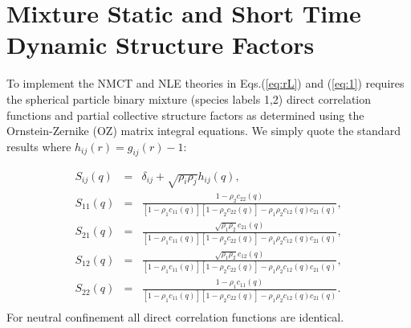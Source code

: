 \documentclass[twocolumn,showpacs,preprintnumbers,amsmath,amssymb,unsortedaddress,
]{revtex4-1}
\begin{document}
\section{Mixture Static and Short Time Dynamic Structure Factors}
To implement the NMCT and NLE theories in Eqs.(\ref{eq:rL}) and (\ref{eq:1}) requires the spherical particle binary mixture (species labels 1,2) direct correlation functions and partial collective structure factors as determined using the Ornstein-Zernike (OZ) matrix integral equations. We simply quote the standard results \cite{34} where $h_{ij}(r) = g_{ij}(r)-1$:

\begin{eqnarray}
S_{ij}(q) & =& \delta_{ij} + \sqrt{\rho_i\rho_j}h_{ij}(q),\nonumber\\
S_{11}(q) &=& \frac{1-\rho_2c_{22}(q)}{[1-\rho_1c_{11}(q)][1-\rho_2c_{22}(q)]-\rho_1\rho_2c_{12}(q)c_{21}(q)},\nonumber\\
S_{21}(q) &=& \frac{\sqrt{\rho_1\rho_2}c_{21}(q)}{[1-\rho_1c_{11}(q)][1-\rho_2c_{22}(q)]-\rho_1\rho_2c_{12}(q)c_{21}(q)},\nonumber\\
S_{12}(q) &=& \frac{\sqrt{\rho_1\rho_2}c_{12}(q)}{[1-\rho_1c_{11}(q)][1-\rho_2c_{22}(q)]-\rho_1\rho_2c_{12}(q)c_{21}(q)},\nonumber\\
S_{22}(q) &=& \frac{1-\rho_1c_{11}(q)}{[1-\rho_1c_{11}(q)][1-\rho_2c_{22}(q)]-\rho_1\rho_2c_{12}(q)c_{21}(q)}.\nonumber\\
\label{eq:61}
\end{eqnarray}
For neutral confinement all direct correlation functions are identical.
\end{document}
